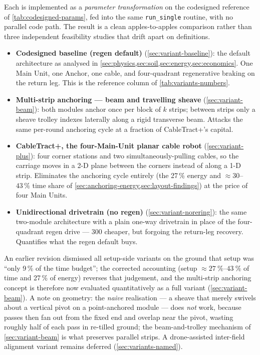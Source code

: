 \documentclass[11pt,a4paper]{article}
\begin{document}
Each is implemented as a \emph{parameter transformation} on the codesigned reference of \cref{tab:codesigned-params}, fed into the same \texttt{run\_single} routine, with no parallel code path. The result is a clean apples-to-apples comparison rather than three independent feasibility studies that drift apart on definitions.

\begin{itemize}[leftmargin=1.6em,itemsep=0.15em]
    \item \textbf{Codesigned baseline (regen default)} (\cref{sec:variant-baseline}): the default architecture as analysed in \cref{sec:physics,sec:soil,sec:energy,sec:economics}. One Main Unit, one Anchor, one cable, and four-quadrant regenerative braking on the return leg. This is the reference column of \cref{tab:variants-numbers}.
    \item \textbf{Multi-strip anchoring --- beam and travelling sheave} (\cref{sec:variant-beam}): both modules anchor once per block of $k$ strips; between strips only a sheave trolley indexes laterally along a rigid transverse beam. Attacks the same per-round anchoring cycle at a fraction of CableTract+'s capital.
    \item \textbf{CableTract+, the four-Main-Unit planar cable robot} (\cref{sec:variant-plus}): four corner stations and two simultaneously-pulling cables, so the carriage moves in a 2-D plane between the corners instead of along a 1-D strip. Eliminates the anchoring cycle entirely (the 27\,\% energy and ${\approx}30$--$43\,\%$ time share of \cref{sec:anchoring-energy,sec:layout-findings}) at the price of four Main Units.
    \item \textbf{Unidirectional drivetrain (no regen)} (\cref{sec:variant-norering}): the same two-module architecture with a plain one-way drivetrain in place of the four-quadrant regen drive --- \SI{300}{\EUR} cheaper, but forgoing the return-leg recovery. Quantifies what the regen default buys.
\end{itemize}

An earlier revision dismissed all setup-side variants on the ground that setup was ``only 9\,\% of the time budget''; the corrected accounting (setup ${\approx}\SIrange{27}{43}{\percent}$ of time and 27\,\% of energy) reverses that judgement, and the multi-strip anchoring concept is therefore now evaluated quantitatively as a full variant (\cref{sec:variant-beam}). A note on geometry: the \emph{naive} realisation --- a sheave that merely swivels about a vertical pivot on a point-anchored module --- does \emph{not} work, because passes then fan out from the fixed end and overlap near the pivot, wasting roughly half of each pass in re-tilled ground; the beam-and-trolley mechanism of \cref{sec:variant-beam} is what preserves parallel strips. A drone-assisted inter-field alignment variant remains deferred (\cref{sec:variants-named}).
\end{document}
